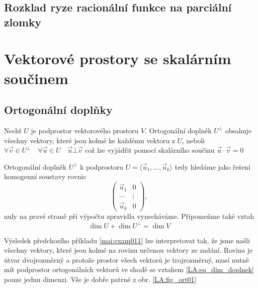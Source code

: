 {    \subsection{Rozklad ryze racionální funkce na parci\-ální zlomky}

       
      
  \section{Vektorové prostory se skalárním součinem}
    \subsection{Ortogonální doplňky}
      Nechť \(U\) je podprostor vektorového prostoru \(V\). Ortogonální doplněk $U^\bot$ obsahuje 
      všechny vektory, které jsou kolmé ke každému vektoru z \(U\), neboli \(\forall\vec{v}\in 
      U^\bot\quad \forall\vec{u}\in U\quad \vec{u}\bot\vec{v}\) což lze vyjádřit pomocí skalárního 
      součinu \(\vec{u}\cdot\vec{v} = 0\)
  
      Ortogonální doplněk \(U^\bot\) k podprostoru \(U = \langle\vec{u}_1,\ldots,\vec{u}_k\rangle\) 
      tedy hledáme jako řešení homogenní soustavy rovnic
      \begin{equation*}
        \left(
          \begin{array}{c|c}
             \vec{u}_1  &   0      \\
             \cdots     &  \vdots  \\
             \vec{u}_k  &   0
          \end{array}
        \right),
      \end{equation*}
      nuly na pravé straně při výpočtu zpravidla vynecháváme. Připomeňme také vztah
      \begin{equation}\label{LA:eq_dim_doplnek}
         \dim U + \dim U^\bot = \dim V
      \end{equation}

        
  
      Výsledek předchozího příkladu \ref{mai:exam011} lze interpretovat tak, že jsme našli všechny 
      vektory, které jsou kolmé na rovinu určenou vektory ze zadání. Rovina je útvar       
      dvojrozměrný a protože prostor všech vektorů je trojrozměrný, musí nutně mít podprostor 
      ortogonálních vektorů ve shodě se vztahem \ref{LA:eq_dim_doplnek} pouze jednu dimenzi. Vše 
      je dobře patrné z obr. \ref{LA:fig_ort01}

} %
\printbibliography[title={Seznam literatury}, heading=subbibliography]
